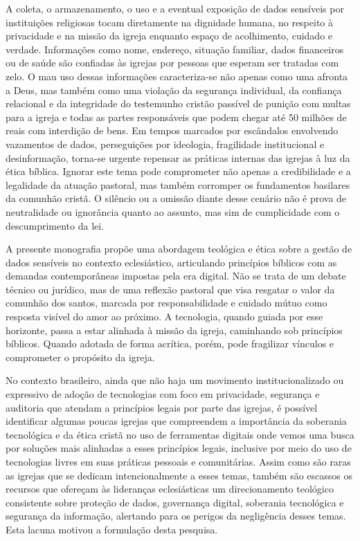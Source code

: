 A coleta, o armazenamento, o uso e a eventual exposição de dados sensíveis por instituições religiosas tocam diretamente na dignidade humana, no respeito à privacidade e na missão da igreja enquanto espaço de acolhimento, cuidado e verdade. Informações como nome, endereço, situação familiar, dados financeiros ou de saúde são confiadas às igrejas por pessoas que esperam ser tratadas com zelo. O mau uso dessas informações caracteriza-se não apenas como uma afronta a Deus, mas também como uma violação da segurança individual, da confiança relacional e da integridade do testemunho cristão passível de punição com multas para a igreja e todas as partes responsáveis que podem chegar até 50 milhões de reais com interdição de bens. Em tempos marcados por escândalos envolvendo vazamentos de dados, perseguições por ideologia, fragilidade institucional e desinformação, torna-se urgente repensar as práticas internas das igrejas à luz da ética bíblica. Ignorar este tema pode comprometer não apenas a credibilidade e a legalidade da atuação pastoral, mas também corromper os fundamentos basilares da comunhão cristã. O silêncio ou a omissão diante desse cenário não é prova de neutralidade ou ignorância quanto ao assunto, mas sim de cumplicidade com o descumprimento da lei.

A presente monografia propõe uma abordagem teológica e ética sobre a gestão de dados sensíveis no contexto eclesiástico, articulando princípios bíblicos com as demandas contemporâneas impostas pela era digital. Não se trata de um debate técnico ou jurídico, mas de uma reflexão pastoral que visa resgatar o valor da comunhão dos santos, marcada por responsabilidade e cuidado mútuo como resposta visível do amor ao próximo. A tecnologia, quando guiada por esse horizonte, passa a estar alinhada à missão da igreja, caminhando sob princípios bíblicos. Quando adotada de forma acrítica, porém, pode fragilizar vínculos e comprometer o propósito da igreja.

No contexto brasileiro, ainda que não haja um movimento institucionalizado ou expressivo de adoção de tecnologias com foco em privacidade, segurança e auditoria que atendam a princípios legais por parte das igrejas, é possível identificar algumas poucas igrejas que compreendem a importância da soberania tecnológica e da ética cristã no uso de ferramentas digitais onde vemos uma busca por soluções mais alinhadas a esses princípios legais, inclusive por meio do uso de tecnologias livres em suas práticas pessoais e comunitárias. Assim como são raras as igrejas que se dedicam intencionalmente a esses temas, também são escassos os recursos que ofereçam às lideranças eclesiásticas um direcionamento teológico consistente sobre proteção de dados, governança digital, soberania tecnológica e segurança da informação, alertando para os perigos da negligência desses temas. Esta lacuna motivou a formulação desta pesquisa.

